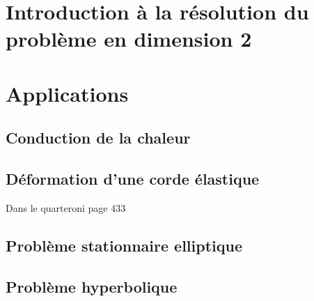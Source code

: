 \documentclass[12pt]{article}
\begin{document}
\section{Introduction à la résolution du problème en dimension 2}


\section{Applications}

\subsection{Conduction de la chaleur}

\subsection{Déformation d'une corde élastique}
Dans le quarteroni page 433

\subsection{Problème stationnaire elliptique}

\subsection{Problème hyperbolique}
\end{document}
